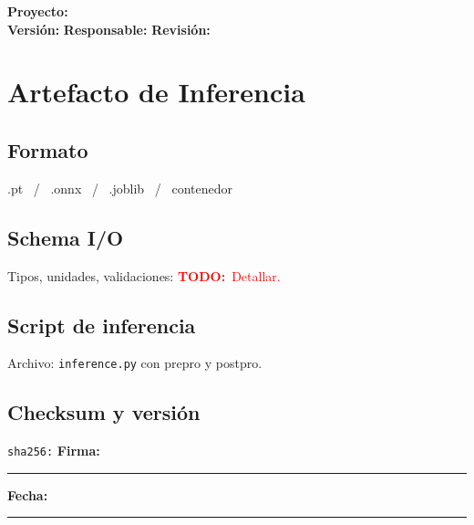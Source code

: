 \documentclass[11pt]{article}
\newcommand{\project}{\textbf{Proyecto:} \underline{\hspace{7cm}}}
\newcommand{\version}{\textbf{Versi\'on:} \underline{\hspace{3cm}}}
\newcommand{\owner}{\textbf{Responsable:} \underline{\hspace{5cm}}}
\newcommand{\review}{\textbf{Revisi\'on:} \underline{\hspace{3cm}}}
\newcommand{\signatureline}{\vspace{0.5cm}\noindent\textbf{Firma:}\ \rule{6cm}{0.4pt} \hfill \textbf{Fecha:}\ \rule{3cm}{0.4pt}}
\newcommand{\todo}[1]{\textcolor{red}{\textbf{TODO:}~#1}}
\begin{document}
\begin{flushright}
\project \\ \version \hspace{1cm} \owner \hspace{1cm} \review
\end{flushright}


\section*{Artefacto de Inferencia}
\subsection*{Formato}
.pt \, / \, .onnx \, / \, .joblib \, / \, contenedor

\subsection*{Schema I/O}
Tipos, unidades, validaciones: \todo{Detallar.}

\subsection*{Script de inferencia}
Archivo: \texttt{inference.py} con prepro y postpro.

\subsection*{Checksum y versi\'on}
\texttt{sha256:} \underline{\hspace{8cm}}
\signatureline

\label{LastPage}
\end{document}
